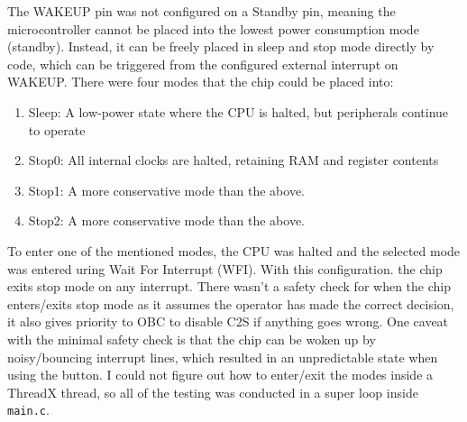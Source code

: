 The WAKEUP pin was not configured on a Standby pin, meaning the microcontroller cannot be placed into the lowest power consumption mode (standby). Instead, it can be freely placed in sleep and stop mode directly by code, which can be triggered from the configured external interrupt on WAKEUP.
\nl
There were four modes that the chip could be placed into:

\begin{enumerate}
    \item Sleep: A low-power state where the CPU is halted, but peripherals continue to operate
    \item Stop0: All internal clocks are halted, retaining RAM and register contents
    \item Stop1: A more conservative mode than the above.
    \item Stop2: A more conservative mode than the above.
\end{enumerate}

To enter one of the mentioned modes, the CPU was halted and the selected mode was entered uring Wait For Interrupt (WFI). With this configuration. the chip exits stop mode on any interrupt. There wasn't a safety check for when the chip enters/exits stop mode as it assumes the operator has made the correct decision, it also gives priority to OBC to disable C2S if anything goes wrong. One caveat with the minimal safety check is that the chip can be woken up by noisy/bouncing interrupt lines, which resulted in an unpredictable state when using the button.
\nl
I could not figure out how to enter/exit the modes inside a ThreadX thread, so all of the testing was conducted in a super loop inside \verb|main.c|.
